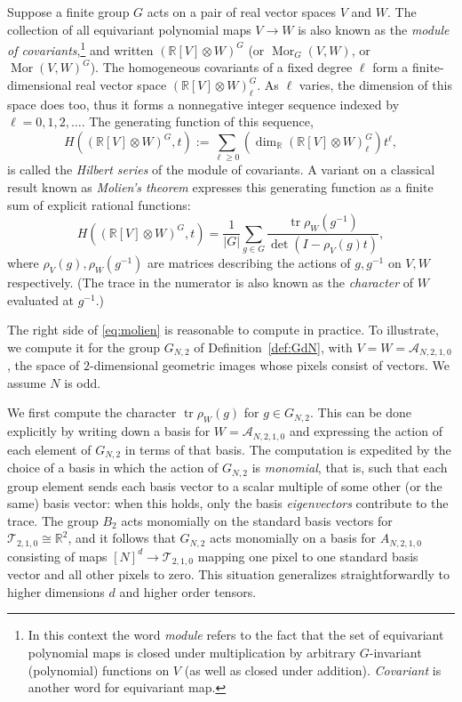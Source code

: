 \documentclass{article}
\theoremstyle{definition}
\begin{document}
Suppose a finite group $G$ acts on a pair of real vector spaces $V$ and $W$. The collection of all equivariant polynomial maps $V\rightarrow W$ is also known as the {\em module of covariants},\footnote{In this context the word {\em module} refers to the fact that the set of equivariant polynomial maps is closed under multiplication by arbitrary $G$-invariant (polynomial) functions on $V$ (as well as closed under addition). {\em Covariant} is another word for equivariant map.} and written $(\mathbb{R}[V]\otimes W)^G$ (or $\operatorname{Mor}_G(V,W)$, or $\operatorname{Mor}(V,W)^G$). The homogeneous covariants of a fixed degree $\ell$ form a finite-dimensional real vector space $(\mathbb{R}[V]\otimes W)^G_\ell$. As $\ell$ varies, the dimension of this space does too, thus it forms a nonnegative integer sequence indexed by $\ell = 0,1,2,\dots$. The generating function of this sequence,
\begin{equation}
H((\mathbb{R}[V]\otimes W)^G,t) := \sum_{\ell \geq 0} \left(\dim_\mathbb{R} (\mathbb{R}[V]\otimes W)^G_\ell\right) t^\ell,
\end{equation}
is called the {\em Hilbert series} of the module of covariants. A variant \cite[Remark~3.4.3]{derksen2015computational} on a classical result known as {\em Molien's theorem} expresses this generating function as a finite sum of explicit rational functions:
\begin{equation}\label{eq:molien}
H((\mathbb{R}[V]\otimes W)^G,t) = \frac{1}{|G|}\sum_{g\in G} \frac{\operatorname{tr}\rho_W(g^{-1})}{\det(I-\rho_V(g)t)},
\end{equation}
where $\rho_V(g), \rho_W(g^{-1})$ are matrices describing the actions of $g, g^{-1}$ on $V, W$ respectively. (The trace in the numerator is also known as the {\em character} of $W$ evaluated at $g^{-1}$.)

The right side of \eqref{eq:molien} is reasonable to compute in practice. To illustrate, we compute it for the group $G_{N,2}$ of Definition~\ref{def:GdN}, with $V=W=\mathcal{A}_{N,2,1,0}$, the space of $2$-dimensional geometric images whose pixels consist of vectors. We assume $N$ is odd.

We first compute the character $\operatorname{tr}\rho_W(g)$ for $g\in G_{N,2}$. This can be done explicitly by writing down a basis for $W=\mathcal{A}_{N,2,1,0}$ and expressing the action of each element of $G_{N,2}$ in terms of that basis. The computation is expedited by the choice of a basis in which the action of $G_{N,2}$ is {\em monomial}, that is, such that each group element sends each basis vector to a scalar multiple of some other (or the same) basis vector: when this holds, only the basis {\em eigenvectors} contribute to the trace. The group $B_2$ acts monomially on the standard basis vectors for $\mathcal{T}_{2,1,0}\cong \mathbb{R}^2$, and it follows that $G_{N,2}$ acts monomially on a basis for $A_{N,2,1,0}$  consisting of maps $[N]^d \rightarrow\mathcal{T}_{2,1,0}$ mapping one pixel to one standard basis vector and all other pixels to zero. This situation generalizes straightforwardly to higher dimensions $d$ and higher order tensors.
\end{document}
